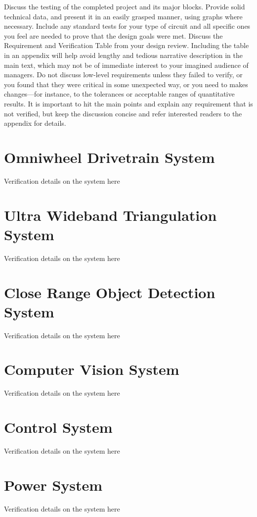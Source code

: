\documentclass{report}
\begin{document}
    Discuss the testing of the completed project and its major blocks. Provide solid technical data, and present it in an easily grasped manner, using graphs where necessary. Include any standard tests for your type of circuit and all specific ones you feel are needed to prove that the design goals were met. Discuss the Requirement and Verification Table from your design review. Including the table in an appendix will help avoid lengthy and tedious narrative description in the main text, which may not be of immediate interest to your imagined audience of managers. Do not discuss low-level requirements unless they failed to verify, or you found that they were critical in some unexpected way, or you need to makes changes—for instance, to the tolerances or acceptable ranges of quantitative results. It is important to hit the main points and explain any requirement that is not verified, but keep the discussion concise and refer interested readers to the appendix for details.

    \section{Omniwheel Drivetrain System}
    Verification details on the system here

    \section{Ultra Wideband Triangulation System}
    Verification details on the system here
    
    \section{Close Range Object Detection System}
    Verification details on the system here
    
    \section{Computer Vision System}
    Verification details on the system here
    
    \section{Control System}
    Verification details on the system here
    
    \section{Power System}
    Verification details on the system here
\end{document}
